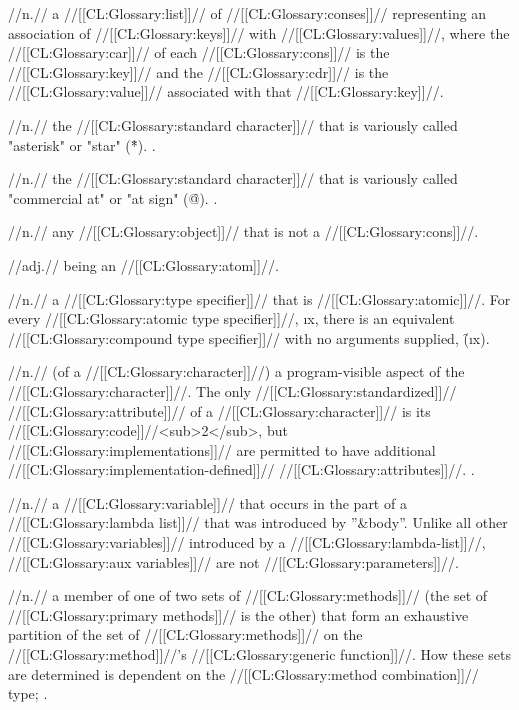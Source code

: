 //n.// a //[[CL:Glossary:list]]// of //[[CL:Glossary:conses]]// representing an association of //[[CL:Glossary:keys]]// with //[[CL:Glossary:values]]//, where the //[[CL:Glossary:car]]// of each //[[CL:Glossary:cons]]// is the //[[CL:Glossary:key]]// and the //[[CL:Glossary:cdr]]// is the //[[CL:Glossary:value]]// associated with that //[[CL:Glossary:key]]//.
 
 //n.// the //[[CL:Glossary:standard character]]// that is variously called "asterisk" or "star" (\f{*}). \Seefigure\StdCharsThree.

 //n.// the //[[CL:Glossary:standard character]]// that is variously called "commercial at" or "at sign" (\f{@}). \Seefigure\StdCharsThree.

 //n.// any //[[CL:Glossary:object]]// that is not a //[[CL:Glossary:cons]]//. 

 //adj.// being an //[[CL:Glossary:atom]]//. 

 //n.// a //[[CL:Glossary:type specifier]]// that is //[[CL:Glossary:atomic]]//. For every //[[CL:Glossary:atomic type specifier]]//, \i{x}, there is an equivalent //[[CL:Glossary:compound type specifier]]// with no arguments supplied, \f{(\i{x})}.

 //n.// (of a //[[CL:Glossary:character]]//) a program-visible aspect of the //[[CL:Glossary:character]]//. The only //[[CL:Glossary:standardized]]// //[[CL:Glossary:attribute]]// of a //[[CL:Glossary:character]]// is its //[[CL:Glossary:code]]//<sub>2</sub>, but //[[CL:Glossary:implementations]]// are permitted to have additional //[[CL:Glossary:implementation-defined]]// //[[CL:Glossary:attributes]]//. \Seesection\CharacterAttributes. 

 //n.// a //[[CL:Glossary:variable]]// that occurs in the part of a //[[CL:Glossary:lambda list]]// that was introduced by ''&body''. Unlike all other //[[CL:Glossary:variables]]// introduced by a //[[CL:Glossary:lambda-list]]//, //[[CL:Glossary:aux variables]]// are not //[[CL:Glossary:parameters]]//.

 //n.// a member of one of two sets of //[[CL:Glossary:methods]]// (the set of //[[CL:Glossary:primary methods]]// is the other) that form an exhaustive partition of the set of //[[CL:Glossary:methods]]// on the //[[CL:Glossary:method]]//'s //[[CL:Glossary:generic function]]//. How these sets are determined is dependent on the //[[CL:Glossary:method combination]]// type; \seesection\IntroToMethods.

